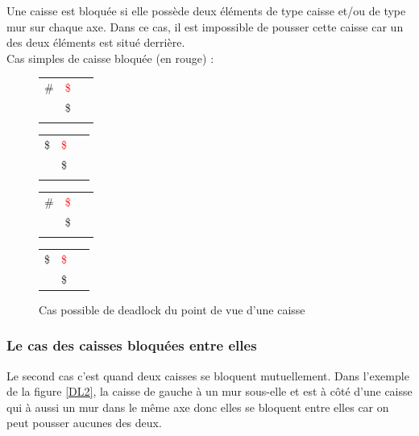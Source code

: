 \documentclass[a4paper,12pt]{article} %
\begin{document}
Une caisse est bloquée si elle possède deux éléments de type caisse et/ou de type mur sur chaque axe. Dans ce cas, il est impossible de pousser cette caisse car un des deux éléments est situé derrière.\\

Cas simples de caisse bloquée (en rouge) : 

\begin{figure}[!h]
\centering
\begin{tabular}{ l c r }
\# &  \textcolor{red}{\$} & \ \\
\  &      \$             & \ \\
\\
\hline
\end{tabular}

\begin{tabular}{ l c r }\\
\$ & \textcolor{red}{\$} & \ \\
\  &      \$             & \ \\
\\
\hline
\end{tabular}

\begin{tabular}{ l c r }\\
\# & \textcolor{red}{\$} & \ \\
\  &      \$             & \ \\
\\
\hline
\end{tabular}

\begin{tabular}{ l c r }\\
\$ & \textcolor{red}{\$} & \ \\
\  &      \$             & \ \\
\end{tabular}

\caption{Cas possible de deadlock du point de vue d'une caisse}
\end{figure}

\subsubsection{Le cas des caisses bloquées entre elles}
\label{cBetween}

Le second cas c'est quand deux caisses se bloquent mutuellement. Dans l'exemple de la figure \ref{DL2}, la caisse de gauche à un mur sous-elle et est à côté d'une caisse qui à aussi un mur dans le même axe donc elles se bloquent entre elles car on peut pousser aucunes des deux.
\end{document}
